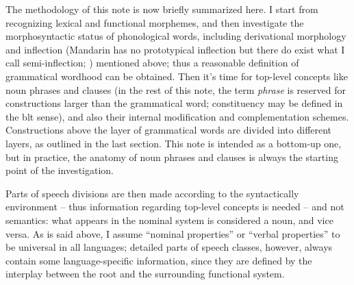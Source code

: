 \documentclass[UTF8, a4paper, oneside, scheme=plain, 12pt]{ctexrep}
\newcommand*{\term}[1]{\emph{#1}}
\begin{document}
{The methodology of this note is now briefly summarized here.
I start from recognizing lexical and functional morphemes,
and then investigate the morphosyntactic status 
of phonological words,
including derivational morphology 
and inflection (Mandarin has no prototypical inflection 
but there do exist what I call semi-inflection; 
)
mentioned above;
thus a reasonable definition of grammatical wordhood can be obtained.
Then it's time for top-level concepts like noun phrases and clauses
(in the rest of this note, the term \term{phrase} is reserved 
for constructions larger than the grammatical word;
constituency may be defined in the \acs{blt} sense), 
and also their internal modification and complementation schemes. 
Constructions above the layer of grammatical words
are divided into different layers, as outlined in the last section. 
This note is intended as a bottom-up one, 
but in practice, the anatomy of noun phrases and clauses 
is always the starting point of the investigation. 

Parts of speech divisions are then made according to the 
syntactically environment -- thus information regarding top-level concepts is needed -- and not semantics: 
what appears in the nominal system is considered a noun, 
and vice versa. 
As is said above, 
I assume ``nominal properties'' or ``verbal properties'' 
to be universal in all languages; 
detailed parts of speech classes, however, 
always contain some language-specific information,
since they are defined by the interplay 
between the root and the surrounding functional system. 

}
\end{document}
